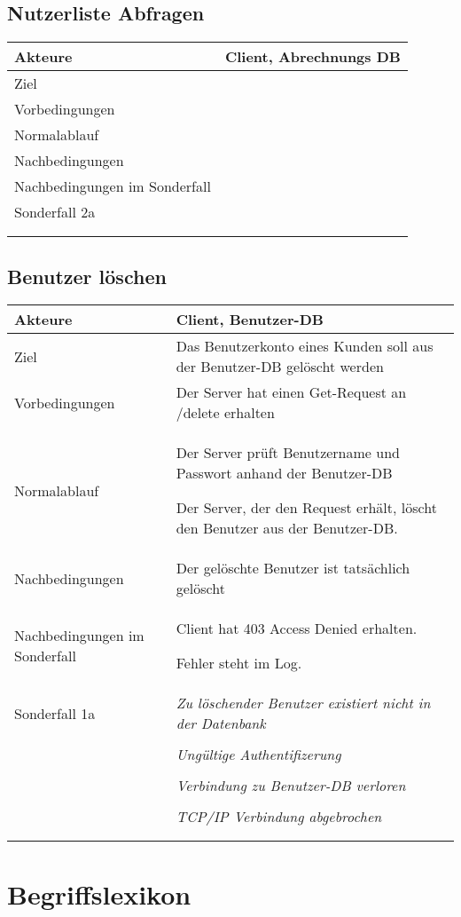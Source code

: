 \documentclass[a4paper,10pt,titlepage]{article}
\makeatletter
\newcommand\novspace{\@minipagetrue}
\newenvironment{owncompactitem}{%
\compactitem
}{%
\@finalstrut\@arstrutbox
\@nameuse{endcompactitem}%
\aftergroup\let\aftergroup\@finalstrut\aftergroup\@gobble
}
\newenvironment{owncompactenum}{%
\compactenum
}{%
\@finalstrut\@arstrutbox
\@nameuse{endcompactenum}%
\aftergroup\let\aftergroup\@finalstrut\aftergroup\@gobble
}
\newcommand{\usecase}[7]
{\subsection{#1}
\setlength{\extrarowheight}{2pt}
\begin{tabular}{|p{0.2\textwidth}|p{0.9\textwidth}|}
\hline
  Akteure & #2\\\hline
  Ziel & #3\\\hline
  Vorbedingungen & \novspace
  	\begin{owncompactitem}[-] #4 \end{owncompactitem} \\\hline
  Normalablauf & \vspace{-7pt}
  	\begin{owncompactenum}[1.] #6 \end{owncompactenum} \\\hline
  Nachbedingungen & \novspace
  	\begin{owncompactitem}[-] #5 \end{owncompactitem} \\\hline
  #7
\end{tabular}
}
\newcommand{\sonderfall}[4][\empty]
{
Sonderfall #2 & \vspace{-10pt}
	\textit{#3}
	\begin{owncompactenum}[{#2}.1] {#4} \end{owncompactenum}
  	\ifthenelse{\equal{#1}{\empty}}
    	{\\\hline} %
    	{\ensuremath{\rightarrow} #1 \\ [+1pt] \hline} %

}
\newcommand{\sondernachbedingung}[1]
{
Nachbedingungen im Sonderfall& \novspace
	\begin{owncompactitem}[-]
		#1
	\end{owncompactitem} \\\hline
}
\newcommand{\begriff}[7]
{\subsection{#1}
\begin{tabular}{|p{0.2\textwidth}|p{0.7\textwidth}|}
\hline
  Bedeutung & #2\\\hline
  Abgrenzung & #3\\\hline
  Gültigkeit & #4\\\hline
  Bezeichnung & #5\\\hline
  Unklarheiten & #6\\\hline
  Querverweise & #7\\\hline
 \end{tabular}}
\makeatother
\begin{document}
\usecase{Nutzerliste Abfragen}{Client, Abrechnungs DB}%
{}%
{%
  \item
}
{%
  \item
}
{%
  \item
}
{%
  \sondernachbedingung{
	\item
	}
  \sonderfall[Panic]{2a}%
	  {}%
	  {
	  \item .
	  }
}



\usecase{Benutzer löschen}{Client, Benutzer-DB}%
{Das Benutzerkonto eines Kunden soll aus der Benutzer-DB gelöscht werden}%
{%
  \item Der Server hat einen Get-Request an /delete erhalten
}
{%
  \item Der gelöschte Benutzer ist tatsächlich gelöscht
}
{%
  \item Der Server prüft Benutzername und Passwort anhand der Benutzer-DB
  \item Der Server, der den Request erhält, löscht den Benutzer aus der Benutzer-DB.
}
{%
  \sondernachbedingung{
	\item Client hat 403 Access Denied erhalten.
	\item Fehler steht im Log.
	}
  \sonderfall[Weiter mit normalem Betrieb]{1a}%
	  {Zu löschender Benutzer existiert nicht in der Datenbank}%
	  {
	  \item Der Server schickt eine entsprechende Fehlermeldung an den Client, der die Lösch-Anfrage verursacht hat
	  }
	  		\sonderfall[Weiter mit normalem Betrieb]{1a}
    {Ungültige Authentifizerung}
    {
    \item Fehler wird ins Log geschrieben
  	\item Der Client erhält eine entsprechende Fehlermeldung mit HTTP-Status 403 Access Denied
    }
	\sonderfall[Kritischer Fehler, Server ist beendet]{*}%
	{Verbindung zu Benutzer-DB verloren}%
  	{
	\item Der Fehler wird ins Log geschrieben (als schwerwiegender Fehler)
	\item Der Client erhält eine entsprechende Fehlermeldung
	\item Der Server wird beendet
  	}

\sonderfall[Weiter mit normalem Betrieb]{**}%
	{TCP/IP Verbindung abgebrochen}%
	{
	\item Fehlermeldung wird ins Log geschrieben
	}
}
\clearpage
\appendix
\section{Begriffslexikon}

\end{document}

